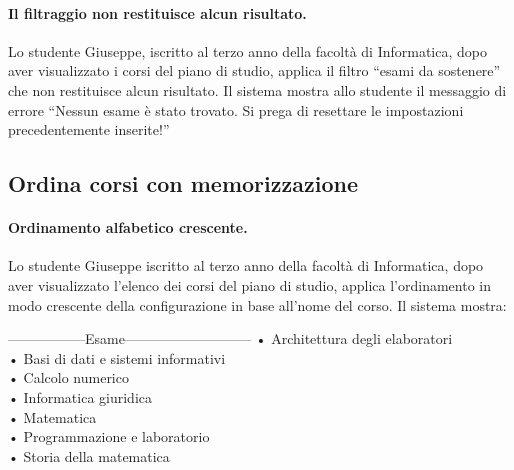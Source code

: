 \paragraph{Il filtraggio non restituisce alcun risultato.}
Lo studente Giuseppe, iscritto al terzo anno della facoltà di Informatica, dopo aver visualizzato i corsi del piano di studio, applica il filtro “esami da sostenere” che non restituisce alcun risultato. Il sistema mostra allo studente il messaggio di errore “Nessun esame è stato trovato. Si prega di resettare le impostazioni precedentemente inserite!”


\subsection{Ordina corsi con memorizzazione}
\paragraph{Ordinamento alfabetico crescente.}
Lo studente Giuseppe iscritto al terzo anno della facoltà di Informatica, dopo aver visualizzato l'elenco dei corsi del piano di studio, applica l'ordinamento in modo crescente della configurazione in base all’nome del corso. Il sistema mostra:
\begin{tabbing}
	\hspace{1cm}-----------------Esame--------------------------- \kill
	\hspace{1cm} • Architettura degli elaboratori \\
	\hspace{1cm} • Basi di dati e sistemi informativi \\
	\hspace{1cm} • Calcolo numerico \\
	\hspace{1cm} • Informatica giuridica \\
	\hspace{1cm} • Matematica \\
	\hspace{1cm} • Programmazione e laboratorio \\
	\hspace{1cm} • Storia della matematica \\
\end{tabbing}


